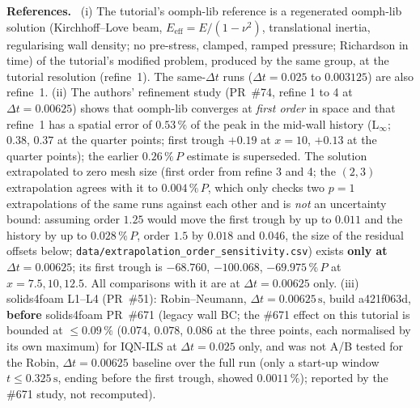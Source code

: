 \documentclass[sn-mathphys,Numbered]{sn-jnl}
\newcommand{\pP}{\ensuremath{\,\%\,P}}
\renewcommand{\paragraph}[1]{\par\vspace{0.15\baselineskip}\noindent\textbf{#1}\ }
\begin{document}
\paragraph{References.}
(i) The tutorial's oomph-lib reference is a regenerated oomph-lib solution (Kirchhoff--Love beam, $E_\mathrm{eff}=E/(1-\nu^2)$, translational inertia, regularising wall density; no pre-stress, clamped, ramped pressure; Richardson in time) of the tutorial's modified problem, produced by the same group, at the tutorial resolution (refine~1). The same-$\Delta t$ runs ($\Delta t=0.025$ to $0.003125$) are also refine~1. (ii) The authors' refinement study (PR~\#74, refine 1 to 4 at $\Delta t=0.00625$) shows that oomph-lib converges at \emph{first order} in space and that refine~1 has a spatial error of $0.53\,\%$ of the peak in the mid-wall history (L$_\infty$; $0.38$, $0.37$ at the quarter points; first trough $+0.19$ at $x=10$, $+0.13$ at the quarter points); the earlier $0.26\,\%\,P$ estimate is superseded. The solution extrapolated to zero mesh size (first order from refine 3 and 4; the $(2,3)$ extrapolation agrees with it to $0.004\,\%\,P$, which only checks two $p=1$ extrapolations of the same runs against each other and is \emph{not} an uncertainty bound: assuming order $1.25$ would move the first trough by up to $0.011$ and the history by up to $0.028\,\%\,P$, order $1.5$ by $0.018$ and $0.046$, the size of the residual offsets below; \texttt{data/extrapolation\_order\_sensitivity.csv}) exists \textbf{only at $\Delta t=0.00625$}; its first trough is $-68.760$, $-100.068$, $-69.975\pP$ at $x=7.5,10,12.5$. All comparisons with it are at $\Delta t=0.00625$ only. (iii) solids4foam L1--L4 (PR~\#51): Robin--Neumann, $\Delta t=0.00625\,\mathrm s$, build a421f063d, \textbf{before} solids4foam PR~\#671 (legacy wall BC; the \#671 effect on this tutorial is bounded at $\le0.09\,\%$ ($0.074$, $0.078$, $0.086$ at the three points, each normalised by its own maximum) for IQN-ILS at $\Delta t=0.025$ only, and was not A/B tested for the Robin, $\Delta t=0.00625$ baseline over the full run (only a start-up window $t\le0.325\,\mathrm s$, ending before the first trough, showed $0.0011\,\%$); reported by the \#671 study, not recomputed).
\end{document}
